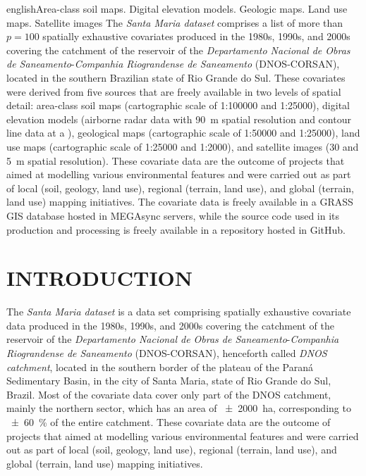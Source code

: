 \def\enkeys{Area-class soil maps. Digital elevation models. Geologic maps. Land use maps. Satellite images}
\begin{chapterabstract}{english}{\enkeys}
The \emph{Santa Maria dataset} comprises a list of more than $p = 100$ spatially exhaustive covariates 
produced in the 1980s, 1990s, and 2000s covering the catchment of the reservoir of the \textit{Departamento 
Nacional de Obras de Saneamento}-\textit{Companhia Riograndense de Saneamento} (DNOS-CORSAN), located in the 
southern Brazilian state of Rio Grande do Sul. These covariates were derived from five sources that are freely 
available in two levels of spatial detail: area-class soil maps (cartographic scale of 1:\num{100000} and 
1:\num{25000}), digital elevation models (airborne radar data with \SI{90}{\m} spatial resolution and 
contour line data at a ), geological maps (cartographic scale of 1:\num{50000} 
and 1:\num{25000}), land use maps (cartographic scale of 1:\num{25000} and 1:\num{2000}), and satellite images 
(30 and \SI{5}{\m} spatial resolution). These covariate data are the outcome of projects that aimed at 
modelling various environmental features and were carried out as part of local (soil, geology, land use), 
regional (terrain, land use), and global (terrain, land use) mapping initiatives. The covariate data is freely 
available in a GRASS GIS database hosted in MEGAsync servers, while the source code used in its production and 
processing is freely available in a repository hosted in GitHub.
\end{chapterabstract}

\formatchapter

\section{INTRODUCTION}
\label{sec:chap05-intro}

The \emph{Santa Maria dataset} is a data set comprising spatially exhaustive covariate data produced in the 
1980s, 1990s, and 2000s covering the catchment of the reservoir of the \textit{Departamento Nacional de Obras 
de Saneamento}-\textit{Companhia Riograndense de Saneamento} (DNOS-CORSAN), henceforth called \emph{DNOS 
catchment}, located in the southern border of the plateau of the Paraná Sedimentary Basin, in the city of 
Santa Maria, state of Rio Grande do Sul, Brazil. Most of the covariate data cover only part of the DNOS 
catchment, mainly the northern sector, which has an area of \SI{\pm2000}{\hectare}, corresponding to 
\SI{\pm60}{\percent} of the entire catchment. These covariate data are the outcome of projects that aimed at 
modelling various environmental features and were carried out as part of local (soil, geology, land use), 
regional (terrain, land use), and global (terrain, land use) mapping initiatives.

